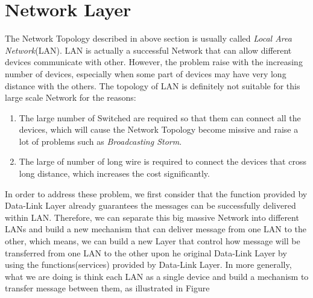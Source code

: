 \documentclass[10pt,a4paper]{article}
\begin{document}
\section{Network Layer}
The Network Topology described in above section is usually called \textit{Local Area Network}(LAN). LAN is actually a successful Network that can allow different devices communicate with other. However, the problem raise with the increasing number of devices, especially when some part of devices may have very long distance with the others. The topology of LAN is definitely not suitable for this large scale Network for the reasons:
\begin{enumerate}
	\item The large number of Switched are required so that them can connect all the devices, which will cause the Network Topology become missive and raise a lot of problems such as \textit{Broadcasting Storm}.
	\item The large of number of long wire is required to connect the devices that cross long distance, which increases the cost significantly. 
\end{enumerate}
In order to address these problem, we first consider that the function provided by Data-Link Layer already guarantees the messages can be successfully delivered within LAN. Therefore, we can separate this big massive Network into different LANs and build a new mechanism that can deliver message from one LAN to the other, which means, we can build a new Layer that control how message will be transferred from one LAN to the other upon he original Data-Link Layer by using the functions(services) provided by Data-Link Layer. In more generally, what we are doing is think each LAN as a single device and build a mechanism to transfer message between them, as illustrated in Figure
\end{document}

